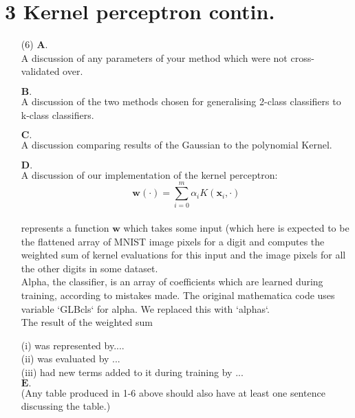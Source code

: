 \documentclass[a4paper,12pt]{article}
\begin{document}
\section*{3 Kernel perceptron contin.}
\begin{enumerate}
\item[(6)]
$\textbf{A.}$\\
A discussion of any parameters of your method which were not cross-validated over.

$\textbf{B.}$\\
A discussion of the two methods chosen for generalising 2-class classifiers to k-class classifiers.

$\textbf{C.}$\\ 
A discussion comparing results of the Gaussian to the polynomial Kernel.

$\textbf{D.}$\\ 
A discussion of our implementation of the kernel perceptron:\\ 
$$\mathbf{w}(\cdot) = \sum_{i=0}^{m} \alpha_i K(\mathbf{x}_i, \cdot)$$ \\
represents a function $\textbf{w}$ which takes some input (which here is expected to be the flattened array of MNIST image pixels for a digit and computes the weighted sum of kernel evaluations for this input and the image pixels for all the other digits in some dataset.\\
Alpha, the classifier, is an array of coefficients which are learned during training, according to mistakes made. The original mathematica code uses variable `GLBcls` for alpha. We replaced this with `alphas`.\\
The result of the weighted sum 

(i) was represented by.... \\
(ii) was evaluated by ... \\
(iii) had new terms added to it during training by ... \\

$\textbf{E.}$\\ 
(Any table produced in 1-6 above should also have at least one sentence discussing the table.)

\end{enumerate}
\clearpage
\end{document}
